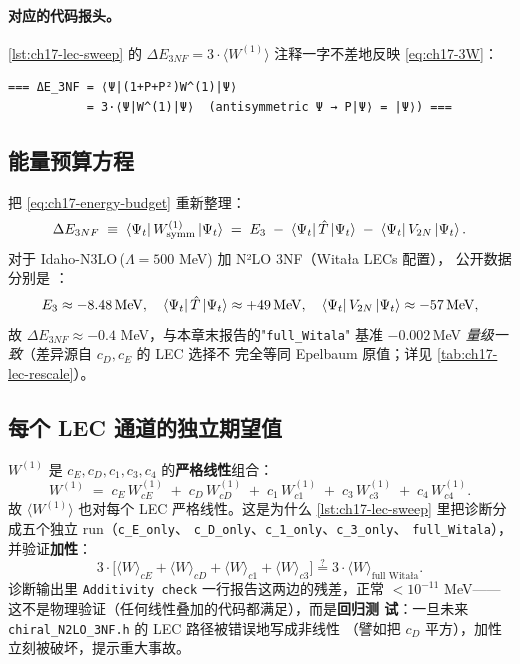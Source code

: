 \paragraph{对应的代码报头。}
\cref{lst:ch17-lec-sweep} 的 \(\Delta E_{3NF} = 3\cdot\langle W^{(1)}\rangle\)
注释一字不差地反映 \cref{eq:ch17-3W}：
\begin{verbatim}
=== ΔE_3NF = ⟨Ψ|(1+P+P²)W^(1)|Ψ⟩
           = 3·⟨Ψ|W^(1)|Ψ⟩  (antisymmetric Ψ → P|Ψ⟩ = |Ψ⟩) ===
\end{verbatim}

\subsection{能量预算方程}
\label{subsec:ch17-energy-budget}

把 \cref{eq:ch17-energy-budget} 重新整理：
\begin{equation}
\label{eq:ch17-DeltaE-3NF}
\Delta E_{3NF}
\;\equiv\; \bra{\Psi_t} W^{(1)}_{\text{symm}} \ket{\Psi_t}
\;=\; E_3 \;-\; \bra{\Psi_t}\hat{T}\ket{\Psi_t} \;-\; \bra{\Psi_t}V_{2N}\ket{\Psi_t}.
\end{equation}
对于 Idaho-N3LO\,(\(\Lambda=500\) MeV) 加 N²LO 3NF（Witała LECs 配置），
公开数据分别是 \cite{Epelbaum2002, Witala2008}：
\begin{equation*}
E_3 \approx -8.48\,\mathrm{MeV},\quad
\bra{\Psi_t}\hat{T}\ket{\Psi_t} \approx +49\,\mathrm{MeV},\quad
\bra{\Psi_t}V_{2N}\ket{\Psi_t} \approx -57\,\mathrm{MeV},
\end{equation*}
故 \(\Delta E_{3NF} \approx -0.4\) MeV，与本章末报告的"\texttt{full\_Witala}"
基准 \(-0.002\)\,MeV \emph{量级一致}（差异源自 \(c_D, c_E\) 的 LEC 选择不
完全等同 Epelbaum 原值；详见 \cref{tab:ch17-lec-rescale}）。

\subsection{每个 LEC 通道的独立期望值}
\label{subsec:ch17-per-lec}

\(W^{(1)}\) 是 \(c_E, c_D, c_1, c_3, c_4\) 的\textbf{严格线性}组合：
\begin{equation}
\label{eq:ch17-W-linear}
W^{(1)} \;=\; c_E\, W^{(1)}_{cE} \;+\; c_D\, W^{(1)}_{cD} \;+\; c_1\, W^{(1)}_{c1}
        \;+\; c_3\, W^{(1)}_{c3} \;+\; c_4\, W^{(1)}_{c4}.
\end{equation}
故 \(\langle W^{(1)}\rangle\) 也对每个 LEC 严格线性。这是为什么
\cref{lst:ch17-lec-sweep} 里把诊断分成五个独立 run（\texttt{c\_E\_only}、
\texttt{c\_D\_only}、\texttt{c\_1\_only}、\texttt{c\_3\_only}、
\texttt{full\_Witala}），并验证\textbf{加性}：
\begin{equation}
\label{eq:ch17-additivity-check}
3\cdot\bigl[\langle W\rangle_{cE} + \langle W\rangle_{cD} + \langle W\rangle_{c1} + \langle W\rangle_{c3}\bigr]
\stackrel{?}{=} 3\cdot\langle W\rangle_{\text{full Witała}}.
\end{equation}
诊断输出里 \texttt{Additivity check} 一行报告这两边的残差，正常 \(<10^{-11}\)
MeV——这不是物理验证（任何线性叠加的代码都满足），而是\textbf{回归测
试}：一旦未来 \texttt{chiral\_N2LO\_3NF.h} 的 LEC 路径被错误地写成非线性
（譬如把 \(c_D\) 平方），加性立刻被破坏，提示重大事故。

